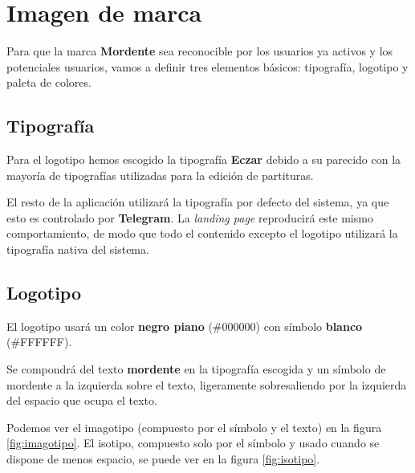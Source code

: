 \section{Imagen de marca}

Para que la marca \textbf{Mordente} sea reconocible por los usuarios ya activos y los potenciales usuarios, vamos a definir tres elementos básicos: tipografía, logotipo y paleta de colores.

\subsection{Tipografía}

Para el logotipo hemos escogido la tipografía \textbf{Eczar} debido a su parecido con la mayoría de tipografías utilizadas para la edición de partituras.

El resto de la aplicación utilizará la tipografía por defecto del sistema, ya que esto es controlado por \textbf{Telegram}. La \textit{landing page} reproducirá este mismo comportamiento, de modo que todo el contenido excepto el logotipo utilizará la tipografía nativa del sistema.

\subsection{Logotipo}

El logotipo usará un color \textbf{negro piano} (\#000000) con símbolo \textbf{blanco} (\#FFFFFF).

Se compondrá del texto \textbf{mordente} en la tipografía escogida y un símbolo de mordente a la izquierda sobre el texto, ligeramente sobresaliendo por la izquierda del espacio que ocupa el texto.

Podemos ver el imagotipo (compuesto por el símbolo y el texto) en la figura \ref{fig:imagotipo}. El isotipo, compuesto solo por el símbolo y usado cuando se dispone de menos espacio, se puede ver en la figura \ref{fig:isotipo}.

